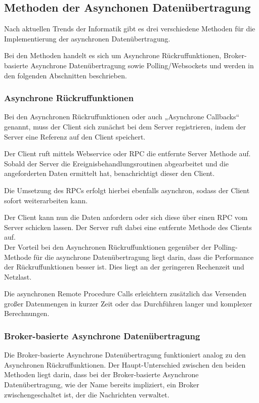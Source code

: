 \subsection{Methoden der Asynchonen Datenübertragung}
Nach aktuellen Trends der Informatik gibt es drei verschiedene Methoden für die Implementierung der asynchronen Datenübertragung. 

Bei den Methoden handelt es sich um Asynchrone Rückruffunktionen, Broker-basierte Asynchrone Datenübertragung sowie Polling/Websockets und werden in den folgenden Abschnitten beschrieben. 

\subsubsection{Asynchrone Rückruffunktionen}
Bei den Asynchronen Rückruffunktionen oder auch „Asynchrone Callbacks“ genannt, muss der Client sich zunächst bei dem Server registrieren, indem der Server eine Referenz auf den Client speichert. \cite{abts:2019}

Der Client ruft mittels Webservice oder \ac{RPC} die entfernte Server Methode auf. Sobald der Server die Ereignisbehandlungsroutinen abgearbeitet und die angeforderten Daten ermittelt hat, benachrichtigt dieser den Client. \cite*{bengelbaun:2015}

Die Umsetzung des RPCs erfolgt hierbei ebenfalls asynchron, sodass der Client sofort weiterarbeiten kann. \cite*{schill:2012}

Der Client kann nun die Daten anfordern oder sich diese über einen RPC vom Server schicken lassen. Der Server ruft dabei eine entfernte Methode des Clients auf. \cite*{abts:2019,schill:2012}  \\

Der Vorteil bei den Asynchronen Rückruffunktionen gegenüber der Polling-Methode für die asynchrone Datenübertragung liegt darin, dass die Performance der Rückruffunktionen besser ist. Dies liegt an der geringeren Rechenzeit und Netzlast. \cite*{abts:2019}

Die asynchronen Remote Procedure Calls erleichtern zusätzlich das Versenden großer Datenmengen in kurzer Zeit oder das Durchführen langer und komplexer Berechnungen. \cite*{schill:2012}

\subsubsection{Broker-basierte Asynchrone Datenübertragung}
Die Broker-basierte Asynchrone Datenübertragung funktioniert analog zu den Asynchronen Rückruffunktionen. Der Haupt-Unterschied zwischen den beiden Methoden liegt darin, dass bei der Broker-basierte Asynchrone Datenübertragung, wie der Name bereits impliziert, ein Broker zwischengeschaltet ist, der die Nachrichten verwaltet. 

